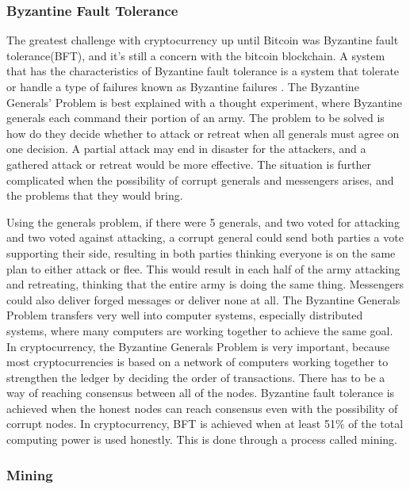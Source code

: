 \documentclass[12pt]{article}
\begin{document}
\subsubsection{Byzantine Fault Tolerance}
The greatest challenge with cryptocurrency up until Bitcoin was Byzantine fault tolerance(BFT), and it's still a concern with the bitcoin blockchain. A system that has the characteristics of Byzantine fault tolerance is a system that tolerate or handle a type of failures known as Byzantine failures \cite{lamport1982byzantine}. The Byzantine Generals' Problem is best explained with a thought experiment, where Byzantine generals each command their portion of an army. The problem to be solved is how do they decide whether to attack or retreat when all generals must agree on one decision. A partial attack may end in disaster for the attackers, and a gathered attack or retreat would be more effective. The situation is further complicated when the possibility of corrupt generals and messengers arises, and the problems that they would bring.

Using the generals problem, if there were 5 generals, and two voted for attacking and two voted against attacking, a corrupt general could send both parties a vote supporting their side, resulting in both parties thinking everyone is on the same plan to either attack or flee. This would result in each half of the army attacking and retreating, thinking that the entire army is doing the same thing.  Messengers could also deliver forged messages or deliver none at all. The Byzantine Generals Problem transfers very well into computer systems, especially distributed systems, where many computers are working together to achieve the same goal. In cryptocurrency, the Byzantine Generals Problem is very important, because most cryptocurrencies is based on a network of computers working together to strengthen the ledger by deciding the order of transactions. There has to be a way of reaching consensus between all of the nodes. Byzantine fault tolerance is achieved when the honest nodes can reach consensus even with the possibility of corrupt nodes. In cryptocurrency, BFT is achieved when at least 51\% of the total computing power is used honestly\cite{nakamoto2009bitcoin}. This is done through a process called mining.
 
\subsubsection{Mining}\label{subsubsec:mining}
\end{document}
